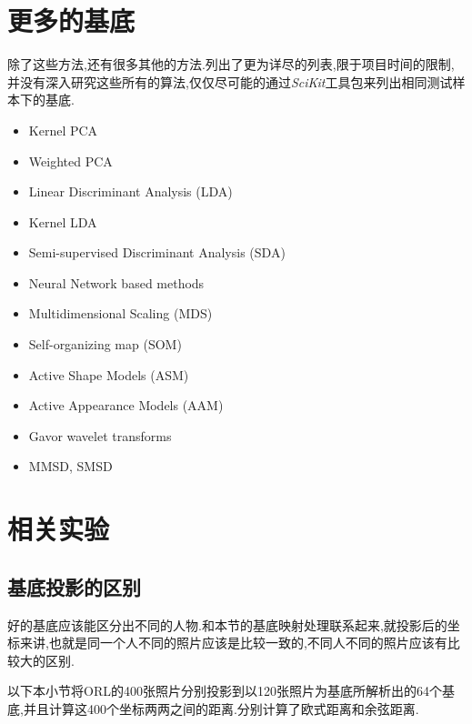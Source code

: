 \section{更多的基底}
除了这些方法,还有很多其他的方法.\cite{de2010face}列出了更为详尽的列表,限于项目时间的限制,并没有深入研究这些所有的算法,仅仅尽可能的通过\textit{SciKit}工具包来列出相同测试样本下的基底.
	\begin{itemize}
		\item Kernel PCA
		\item Weighted PCA
		\item Linear Discriminant Analysis (LDA)
		\item Kernel LDA
		\item Semi-supervised Discriminant Analysis (SDA)
		\item Neural Network based methods
		\item Multidimensional Scaling (MDS)
		\item Self-organizing map (SOM)
		\item Active Shape Models (ASM)
		\item Active Appearance Models (AAM)
		\item Gavor wavelet transforms
		\item MMSD, SMSD
	\end{itemize}

\section{相关实验}
\subsection{基底投影的区别}
\label{sec:pnibase}
好的基底应该能区分出不同的人物.和本节的基底映射处理联系起来,就投影后的坐标来讲,也就是同一个人不同的照片应该是比较一致的,不同人不同的照片应该有比较大的区别.\newline

以下本小节将ORL的400张照片分别投影到以120张照片为基底所解析出的64个基底,并且计算这400个坐标两两之间的距离.分别计算了欧式距离和余弦距离.



